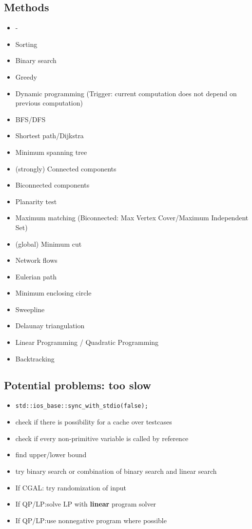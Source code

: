 \documentclass[a4paper, 10pt]{article}
\begin{document}
        \subsection*{Methods}
            \begin{itemize}
                \item -
                \item Sorting
                \item Binary search
                \item Greedy
                \item Dynamic programming (Trigger: current computation does not depend on previous computation)
                \item BFS/DFS
                \item Shortest path/Dijkstra
                \item Minimum spanning tree
                \item (strongly) Connected components
                \item Biconnected components 
                \item Planarity test 
                \item Maximum matching (Biconnected: Max Vertex Cover/Maximum Independent Set)
                \item (global) Minimum cut
                \item Network flows
                \item Eulerian path
                \item Minimum enclosing circle
                \item Sweepline
                \item Delaunay triangulation
                \item Linear Programming / Quadratic Programming
                \item Backtracking
            \end{itemize}


        \subsection*{Potential problems: too slow}
            \begin{itemize}
                \item \texttt{std::ios\_base::sync\_with\_stdio(false);}
                \item check if there is possibility for a cache over testcases
                \item check if every non-primitive variable is called by reference
                \item find upper/lower bound
                \item try binary search or combination of binary search and linear search
                \item If CGAL: try randomization of input
                \item If QP/LP:solve LP with \textbf{linear} program solver
                \item If QP/LP:use nonnegative program where possible
            \end{itemize}
\end{document}
